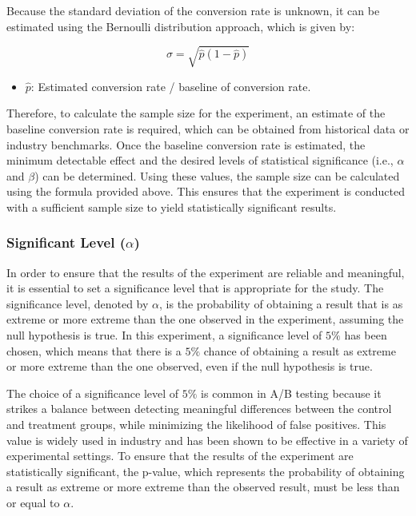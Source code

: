 \documentclass{article}
\begin{document}
Because the standard deviation of the conversion rate is unknown, it can be estimated using the Bernoulli distribution approach, which is given by:

$$\sigma=\sqrt{\hat{p}(1-\hat{p})}$$

\begin{itemize}
    \item $\hat{p}$: Estimated conversion rate / baseline of conversion rate.
\end{itemize}

Therefore, to calculate the sample size for the experiment, an estimate of the baseline conversion rate is required, which can be obtained from historical data or industry benchmarks. Once the baseline conversion rate is estimated, the minimum detectable effect and the desired levels of statistical significance (i.e., $\alpha$ and $\beta$) can be determined. Using these values, the sample size can be calculated using the formula provided above. This ensures that the experiment is conducted with a sufficient sample size to yield statistically significant results.

\subsubsection*{Significant Level ($\alpha$)} 

In order to ensure that the results of the experiment are reliable and meaningful, it is essential to set a significance level that is appropriate for the study. The significance level, denoted by $\alpha$, is the probability of obtaining a result that is as extreme or more extreme than the one observed in the experiment, assuming the null hypothesis is true. In this experiment, a significance level of $5\%$ has been chosen, which means that there is a $5\%$ chance of obtaining a result as extreme or more extreme than the one observed, even if the null hypothesis is true.

The choice of a significance level of $5\%$ is common in A/B testing because it strikes a balance between detecting meaningful differences between the control and treatment groups, while minimizing the likelihood of false positives. This value is widely used in industry and has been shown to be effective in a variety of experimental settings. To ensure that the results of the experiment are statistically significant, the p-value, which represents the probability of obtaining a result as extreme or more extreme than the observed result, must be less than or equal to $\alpha$.
\end{document}
